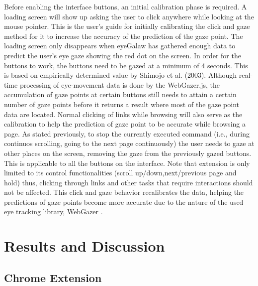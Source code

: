 \documentclass[journal]{./IEEE/IEEEtran}
\begin{document}
Before enabling the interface buttons, an initial calibration phase is required. A loading screen will show up asking the user to click anywhere while looking at the mouse pointer. This is  the user's guide for initially calibrating the click and gaze method for it to increase the accuracy of the prediction of the gaze point. The loading screen  only disappears when eyeGalaw has gathered enough data to predict the user's eye gaze showing the red dot on the screen. In order for the buttons to work, the buttons need to be gazed at a minimum of 4 seconds. This is based on empirically determined value by  Shimojo et al. (2003). Although real-time processing of eye-movement data is done by the WebGazer.js, the accumulation of gaze points at certain buttons still needs to attain a certain number of gaze points before it returns a result where most of the gaze point data are located. Normal clicking of links while browsing will also serve as the calibration to help the prediction of gaze point to be accurate while browsing a page. As stated previously, to stop the currently executed command (i.e.,  during continuos scrolling, going to the next page continuously) the user needs to gaze at other places on the screen, removing the gaze from the previously gazed buttons.  This is applicable to all the buttons on the interface. Note that extension is only limited to its control functionalities (scroll up/down,next/previous page and hold) thus, clicking through links and other tasks that require interactions should not be affected. This click and gaze behavior recalibrates the data, helping the predictions of gaze points become more accurate due to the nature of the used eye tracking library, WebGazer \cite{papoutsaki2016webgazer}. 

\section {Results and Discussion }
\subsection {Chrome Extension}



\end{document}
